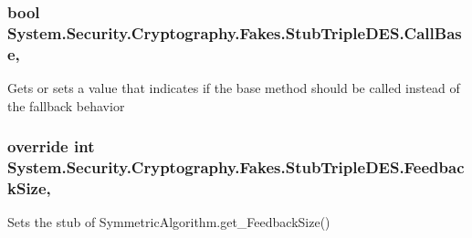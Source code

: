 \hypertarget{class_system_1_1_security_1_1_cryptography_1_1_fakes_1_1_stub_triple_d_e_s_ae442163d0c9b9d05adbb713cab666bd4}{
\subsubsection[{Call\-Base}]{\setlength{\rightskip}{0pt plus 5cm}bool System.\-Security.\-Cryptography.\-Fakes.\-Stub\-Triple\-D\-E\-S.\-Call\-Base\hspace{0.3cm}{\ttfamily [get]}, {\ttfamily [set]}}}\label{class_system_1_1_security_1_1_cryptography_1_1_fakes_1_1_stub_triple_d_e_s_ae442163d0c9b9d05adbb713cab666bd4}


Gets or sets a value that indicates if the base method should be called instead of the fallback behavior

\hypertarget{class_system_1_1_security_1_1_cryptography_1_1_fakes_1_1_stub_triple_d_e_s_aa307c2c7e02a7c9f179b4d5b7a215f20}{
\subsubsection[{Feedback\-Size}]{\setlength{\rightskip}{0pt plus 5cm}override int System.\-Security.\-Cryptography.\-Fakes.\-Stub\-Triple\-D\-E\-S.\-Feedback\-Size\hspace{0.3cm}{\ttfamily [get]}, {\ttfamily [set]}}}\label{class_system_1_1_security_1_1_cryptography_1_1_fakes_1_1_stub_triple_d_e_s_aa307c2c7e02a7c9f179b4d5b7a215f20}


Sets the stub of Symmetric\-Algorithm.\-get\-\_\-\-Feedback\-Size()

